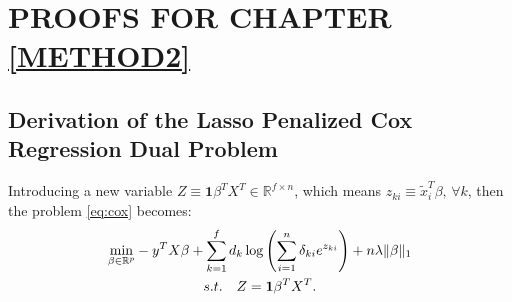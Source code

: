 \appendix
\singlespace
\renewcommand{\thechapter}{\Alph{chapter}}
\chapter{PROOFS FOR CHAPTER \ref{METHOD2}}
\section{Derivation of the Lasso Penalized Cox Regression Dual Problem}
\label{sec:dualcox}

Introducing a new variable $Z\equiv\mathbf{1}\beta^TX^T\in\mathbb{R}^{f\times n}$, which means $z_{ki}\equiv\tilde{x}_i^T\beta,\,\forall k$, then the problem \eqref{eq:cox} becomes:
\begin{equation}
    \label{eq:dual+z}
    \begin{gathered}
    \underset{\beta\in \mathbb{R}^p}{\mathrm{min}}-y^TX\beta+\sum_{k=1}^f d_k\log\left(\sum_{i=1}^n \delta_{ki} e^{z_{ki}}\right)+n\lambda\lVert\beta\rVert_1\\s.t.\quad Z=\mathbf{1}\beta^TX^T.
\end{gathered}
\end{equation}

